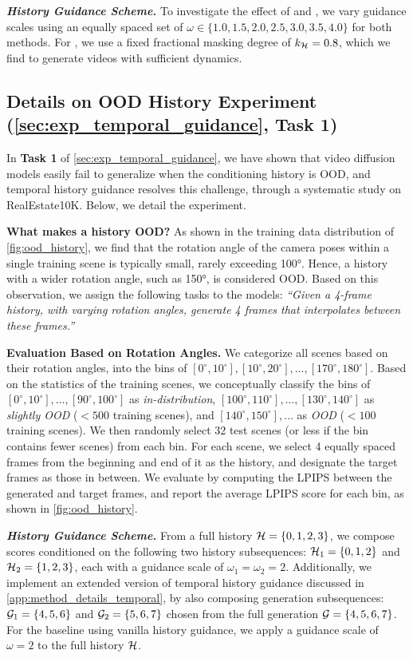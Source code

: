\textbf{\emph{History Guidance Scheme.}} To investigate the effect of \HGv and \HGf, we vary guidance scales using an equally spaced set of $\omega \in \{1.0, 1.5, 2.0, 2.5, 3.0, 3.5, 4.0\}$ for both methods. For \HGf, we use a fixed fractional masking degree of $k_{\mathcal{H}} = 0.8$, which we find to generate videos with sufficient dynamics.

\subsection{Details on OOD History Experiment (\cref{sec:exp_temporal_guidance}, \textbf{Task 1})} In \textbf{Task 1} of \cref{sec:exp_temporal_guidance}, we have shown that video diffusion models easily fail to generalize when the conditioning history is OOD, and temporal history guidance resolves this challenge, through a systematic study on RealEstate10K. Below, we detail the experiment.

\textbf{What makes a history OOD?} As shown in the training data distribution of \cref{fig:ood_history}, we find that the rotation angle of the camera poses within a single training scene is typically small, rarely exceeding 100°. Hence, a history with a wider rotation angle, such as 150°, is considered OOD. Based on this observation, we assign the following tasks to the models: \emph{``Given a 4-frame history, with varying rotation angles, generate 4 frames that interpolates between these frames.''}

\textbf{Evaluation Based on Rotation Angles.} We categorize all scenes based on their rotation angles, into the bins of $[0^\circ, 10^\circ], [10^\circ, 20^\circ], \ldots, [170^\circ, 180^\circ]$. Based on the statistics of the training scenes, we conceptually classify the bins of $[0^\circ, 10^\circ], \ldots, [90^\circ, 100^\circ]$ as \emph{in-distribution}, $[100^\circ, 110^\circ], \ldots, [130^\circ, 140^\circ]$ as \emph{slightly OOD} ($< 500$ training scenes), and $[140^\circ, 150^\circ], \ldots$ as \emph{OOD} ($< 100$ training scenes). We then randomly select 32 test scenes (or less if the bin contains fewer scenes) from each bin. For each scene, we select 4 equally spaced frames from the beginning and end of it as the history, and designate the target frames as those in between. We evaluate by computing the LPIPS between the generated and target frames, and report the average LPIPS score for each bin, as shown in \cref{fig:ood_history}.

\textbf{\emph{History Guidance Scheme.}} From a full history ${\mathcal{H}} = \{0, 1, 2, 3\}$, we compose scores conditioned on the following two history subsequences: ${\mathcal{H}}_1 = \{0, 1, 2\}$ and ${\mathcal{H}}_2 = \{1, 2, 3\}$, each with a guidance scale of $\omega_1 = \omega_2 = 2$. Additionally, we implement an extended version of temporal history guidance discussed in \cref{app:method_details_temporal}, by also composing generation subsequences: ${\mathcal{G}}_1 = \{4, 5, 6\}$ and ${\mathcal{G}}_2 = \{5, 6, 7\}$ chosen from the full generation ${\mathcal{G}} = \{4, 5, 6, 7\}$. For the baseline using vanilla history guidance, we apply a guidance scale of $\omega = 2$ to the full history ${\mathcal{H}}$.



